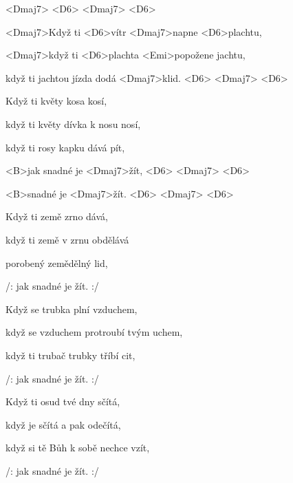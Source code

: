 

<Dmaj7> <D6> <Dmaj7> <D6>

\zr
<Dmaj7>Když ti <D6>vítr <Dmaj7>napne <D6>plachtu,

<Dmaj7>když ti <D6>plachta <Emi>popožene jachtu,

když ti jachtou jízda dodá <Dmaj7>klid.
<D6> <Dmaj7> <D6>
\kr

\zs
Když ti květy kosa kosí,

když ti květy dívka k nosu nosí,

když ti rosy kapku dává pít,

<B>jak snadné je <Dmaj7>žít,
<D6>
<Dmaj7>
<D6>

<B>snadné je <Dmaj7>žít.
<D6>
<Dmaj7>
<D6>
\ks

\zr \kr

\zs
Když ti země zrno dává,

když ti země v zrnu obdělává

porobený zemědělný lid,

/: jak snadné je žít. :/
\ks

\zr \kr

\zs
Když se trubka plní vzduchem,

když se vzduchem protroubí tvým uchem,

když ti trubač trubky tříbí cit,

/: jak snadné je žít. :/
\ks

\zr \kr

\zs
Když ti osud tvé dny sčítá,

když je sčítá a pak odečítá,

když si tě Bůh k sobě nechce vzít,

/: jak snadné je žít. :/
\ks

\kp
